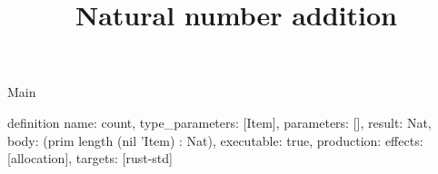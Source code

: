 \begin{lexlean}{Main}
\title{Natural number addition}
\begin{semanticmodule}
definition{
  name: count,
  type_parameters: [Item],
  parameters: [],
  result: Nat,
  body: (prim length (nil 'Item) : Nat),
  executable: true,
  production: {effects: [allocation], targets: [rust-std]}
}
\end{semanticmodule}
\end{lexlean}
